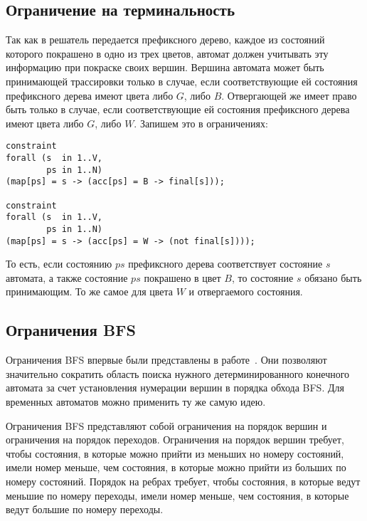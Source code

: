 \documentclass[times,specification,annotation]{itmo-student-thesis}
\begin{document}
\subsection{Ограничение на терминальность}

Так как в решатель передается префиксного дерево, каждое из состояний которого покрашено в одно из трех цветов, автомат должен учитывать эту информацию при покраске своих вершин.
Вершина автомата может быть принимающей трассировки только в случае, если соответствующие ей состояния префиксного дерева имеют цвета либо $G$, либо $B$. Отвергающей же имеет право
быть только в случае, если соответствующие ей состояния префиксного дерева имеют цвета либо $G$, либо $W$. Запишем это в ограничениях:

\begin{lstlisting}[float=!h,language=Mzn,caption={Ограничения на терминальность},label={term}]
constraint
forall (s  in 1..V,
        ps in 1..N)
(map[ps] = s -> (acc[ps] = B -> final[s]));

constraint
forall (s  in 1..V,
        ps in 1..N)
(map[ps] = s -> (acc[ps] = W -> (not final[s])));
\end{lstlisting}

То есть, если состоянию $ps$ префиксного дерева соответствует состояние $s$ автомата, а также состояние $ps$ покрашено в цвет $B$, то состояние $s$ обязано быть принимающим. То же
самое для цвета $W$ и отвергаемого состояния.

\subsection{Ограничения BFS}

Ограничения BFS впервые были представлены в работе~\cite{bfs}. Они позволяют значительно сократить область поиска нужного детерминированного конечного 
автомата за счет установления нумерации вершин в порядка обхода BFS. Для временных автоматов можно применить ту же самую идею.

Ограничения BFS представляют собой ограничения на порядок вершин и ограничения на порядок переходов. Ограничения на порядок вершин требует, чтобы состояния, в которые можно прийти
из меньших но номеру состояний, имели номер меньше, чем состояния, в которые можно прийти из больших по номеру состояний. Порядок на ребрах требует, чтобы состояния, в которые
ведут меньшие по номеру переходы, имели номер меньше, чем состояния, в которые ведут большие по номеру переходы.
\end{document}
